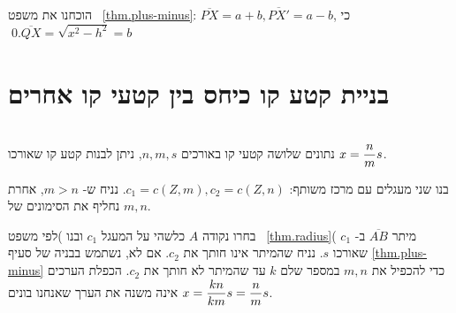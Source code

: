 הוכחנו את משפט~%
\ref{thm.plus-minus}:
$\overline{PX}=a+b, \overline{PX'}=a-b$,
כי
$\overline{QX}=\sqrt{x^2-h^2}=b$.\qed



\section{בניית קטע קו כיחס בין קטעי קו אחרים}
\label{s.relative}

\begin{theorem}\label{thm.ratio}\mbox{}\\
נתונים שלושה קטעי קו באורכים 
$n,m,s$,
ניתן לבנות קטע קו שאורכו
$x = \displaystyle\frac{n}{m}s$.%
\end{theorem}
בנו שני מעגלים עם מרכז משותף:
$c_1 = c(Z,m), c_2 = c(Z,n)$.
נניח ש-%
$m>n$,
אחרת נחליף את הסימונים של
$m,n$.

בחרו נקודה
$A$
כלשהי על המעגל 
$c_1$
ובנו )לפי משפט~%
\ref{thm.radius}(
מיתר
$\overline{AB}$
ב-%
$c_1$
שאורכו
$s$.
נניח שהמיתר אינו חותך את
$c_2$.
אם לא, נשתמש בבניה של סעיף
\ref{thm.plus-minus}
כדי להכפיל את
$m,n$
במספר שלם
$k$
עד שהמיתר לא חותך את
$c_2$.
הכפלת הערכים אינה משנה את הערך שאנחנו בונים
$x = \displaystyle\frac{kn}{km}s = \displaystyle\frac{n}{m}s$.

